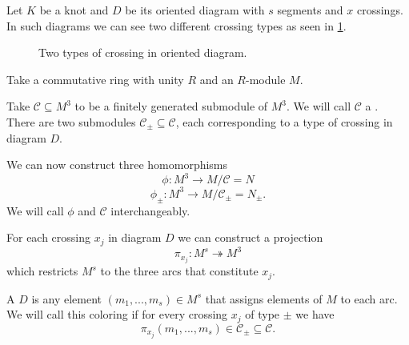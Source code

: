 Let $K$ be a knot and $D$ be its oriented diagram with $s$ segments and $x$ crossings. In such diagrams we can see two different crossing types as seen in \cref{crossing_type}. 
\begin{figure}[h]\centering
  \caption{Two types of crossing in oriented diagram.\label{crossing_type}}
\end{figure}

Take a commutative ring with unity $R$ and an $R$-module $M$.

\begin{definition}
  Take $\mathcal{C}\subseteq M^3$ to be a finitely generated submodule of $M^3$. We will call $\mathcal{C}$ a . There are two submodules $\mathcal{C}_\pm\subseteq \mathcal{C}$, each corresponding to a type of crossing in diagram $D$. 
\end{definition}

We can now construct three homomorphisms
$$\phi:M^3\to M/\mathcal{C}=N$$
$$\phi_\pm:M^3\to M/\mathcal{C}_\pm=N_\pm.$$
We will call $\phi$ and $\mathcal{C}$  interchangeably.



For each crossing $x_j$ in diagram $D$ we can construct a projection 
$$\pi_{x_j}:M^s\twoheadrightarrow M^3$$
which restricts $M^s$ to the three arcs that constitute $x_j$.

\begin{definition}
  A  $D$ is any element $(m_1,..., m_s)\in M^s$ that assigns elements of $M$ to each arc. We will call this coloring  if for every crossing $x_j$ of type $\pm$ we have 
  $$\pi_{x_j}(m_1,..., m_s)\in \mathcal{C}_\pm\subseteq\mathcal{C}.$$
\end{definition}

